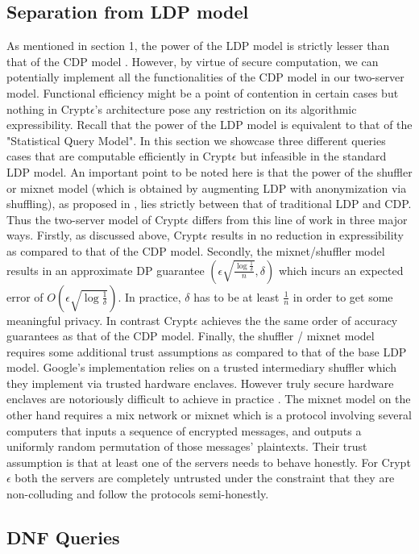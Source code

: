 \subsection{Separation from LDP model}
As mentioned in section 1, the power of the \textsf{LDP} model is strictly lesser than that of the \textsf{CDP} model \cite{Kasivi,mixnets}. However, by virtue of secure computation, we can potentially implement all the functionalities of the \textsf{CDP} model in our two-server model. Functional efficiency might be a point of contention in certain cases but nothing in Crypt$\epsilon$'s architecture pose any  restriction on its algorithmic expressibility. Recall that the power of the \textsf{LDP} model is equivalent to that of the "Statistical Query Model". In this section we showcase three different queries cases that are computable efficiently in Crypt$\epsilon$ but infeasible in the standard \textsf{LDP} model. 
An important point to be noted here is that the power of the shuffler or mixnet model  (which is obtained by augmenting \textsf{LDP} with anonymization via shuffling), as proposed in \cite{Prochlo, mixnets,amplification},  lies strictly between that of traditional \textsf{LDP} and \textsf{CDP}. Thus the two-server model of Crypt$\epsilon$ differs from this line of work in three major ways. Firstly, as discussed above, Crypt$\epsilon$ results in no reduction in expressibility as compared to that of the \textsf{CDP} model. Secondly, the mixnet/shuffler model results in an approximate DP guarantee $(\epsilon\sqrt{\frac{\log\frac{1}{\delta}}{n}},\delta)$ which incurs an expected error of $O(\epsilon\sqrt{\log\frac{1}{\delta}})$.  In practice, $\delta$ has to be at least $\frac{1}{n}$ in order to get some meaningful privacy. In contrast Crypt$\epsilon$ achieves the the same order of accuracy guarantees as that of the \textsf{CDP} model. Finally, the shuffler / mixnet model requires some additional trust assumptions as compared to that of the base \textsf{LDP} model. Google's implementation relies on a trusted intermediary shuffler which they implement via trusted hardware enclaves. However truly secure hardware enclaves are notoriously difficult to achieve in practice \cite{foreshadow}. The mixnet model on the other hand requires a  mix network or mixnet which is a protocol involving several computers that inputs a sequence
of encrypted messages, and outputs a uniformly random permutation of those messages' plaintexts.  Their trust assumption is that at least one of the servers needs to behave honestly. For Crypt$\epsilon$ both the servers are completely untrusted under the constraint that they are non-colluding and follow the protocols semi-honestly. \subsection*{DNF Queries}
